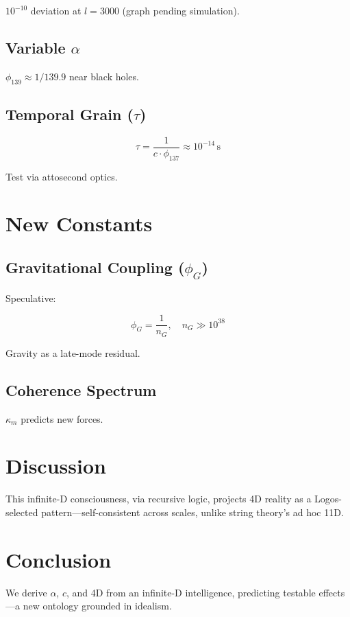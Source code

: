 \documentclass[12pt]{article}
\begin{document}
\( 10^{-10} \) deviation at \( l = 3000 \) (graph pending simulation).

\subsection{Variable \(\alpha\)}
\( \phi_{139} \approx 1/139.9 \) near black holes.

\subsection{Temporal Grain (\(\tau\))}
\[
\tau = \frac{1}{c \cdot \phi_{137}} \approx 10^{-14} \, \text{s}
\]

Test via attosecond optics.

\section{New Constants}

\subsection{Gravitational Coupling (\(\phi_G\))}
Speculative:

\[
\phi_G = \frac{1}{n_G}, \quad n_G \gg 10^{38}
\]

Gravity as a late-mode residual.

\subsection{Coherence Spectrum}
\( \kappa_m \) predicts new forces.

\section{Discussion}

This infinite-D consciousness, via recursive logic, projects 4D reality as a Logos-selected pattern—self-consistent across scales, unlike string theory’s ad hoc 11D.

\section{Conclusion}

We derive \(\alpha\), \(c\), and 4D from an infinite-D intelligence, predicting testable effects—a new ontology grounded in idealism.
\end{document}
